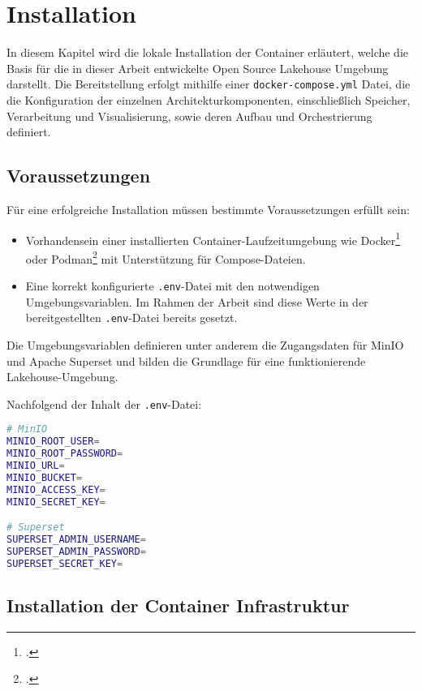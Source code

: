 \chapter{Installation}\label{chapter:Installation}

In diesem Kapitel wird die lokale Installation der Container erläutert, welche die Basis für die in dieser Arbeit entwickelte Open Source Lakehouse Umgebung darstellt. Die Bereitstellung erfolgt mithilfe einer \lstinline|docker-compose.yml| Datei, die die Konfiguration der einzelnen Architekturkomponenten, einschließlich Speicher, Verarbeitung und Visualisierung, sowie deren Aufbau und Orchestrierung definiert.

\section{Voraussetzungen}
Für eine erfolgreiche Installation müssen bestimmte Voraussetzungen erfüllt sein:

\begin{itemize}
    \item Vorhandensein einer installierten Container-Laufzeitumgebung wie Docker\footcite{Dockerinc.DevelopFasterRun2025} oder Podman\footcite{Podman.DevelopFasterRun2025} mit Unterstützung für Compose-Dateien.
    \item Eine korrekt konfigurierte \lstinline|.env|-Datei mit den notwendigen Umgebungsvariablen. Im Rahmen der Arbeit sind diese Werte in der bereitgestellten \lstinline|.env|-Datei bereits gesetzt.
\end{itemize}

Die Umgebungsvariablen definieren unter anderem die Zugangsdaten für MinIO und Apache Superset und bilden die Grundlage für eine funktionierende Lakehouse-Umgebung.

Nachfolgend der Inhalt der \lstinline|.env|-Datei:

\begin{lstlisting}[language=bash]
# MinIO
MINIO_ROOT_USER=
MINIO_ROOT_PASSWORD=
MINIO_URL=
MINIO_BUCKET=
MINIO_ACCESS_KEY=
MINIO_SECRET_KEY=

# Superset
SUPERSET_ADMIN_USERNAME=
SUPERSET_ADMIN_PASSWORD=
SUPERSET_SECRET_KEY=
\end{lstlisting} 

\section{Installation der Container Infrastruktur}

